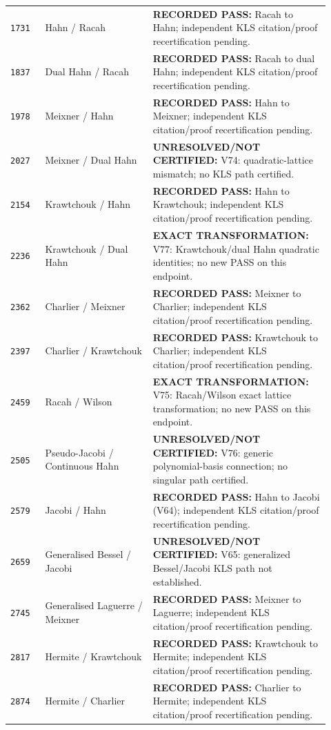 \documentclass[11pt]{article}
\begin{document}
\begin{longtable}{@{}p{0.10\linewidth}p{0.31\linewidth}p{0.51\linewidth}@{}}
\texttt{1731} & Hahn / Racah & \textbf{RECORDED PASS:} Racah to Hahn; independent KLS citation/proof recertification pending. \\
\texttt{1837} & Dual Hahn / Racah & \textbf{RECORDED PASS:} Racah to dual Hahn; independent KLS citation/proof recertification pending. \\
\texttt{1978} & Meixner / Hahn & \textbf{RECORDED PASS:} Hahn to Meixner; independent KLS citation/proof recertification pending. \\
\texttt{2027} & Meixner / Dual Hahn & \textbf{UNRESOLVED/NOT CERTIFIED:} V74: quadratic-lattice mismatch; no KLS path certified. \\
\texttt{2154} & Krawtchouk / Hahn & \textbf{RECORDED PASS:} Hahn to Krawtchouk; independent KLS citation/proof recertification pending. \\
\texttt{2236} & Krawtchouk / Dual Hahn & \textbf{EXACT TRANSFORMATION:} V77: Krawtchouk/dual Hahn quadratic identities; no new PASS on this endpoint. \\
\texttt{2362} & Charlier / Meixner & \textbf{RECORDED PASS:} Meixner to Charlier; independent KLS citation/proof recertification pending. \\
\texttt{2397} & Charlier / Krawtchouk & \textbf{RECORDED PASS:} Krawtchouk to Charlier; independent KLS citation/proof recertification pending. \\
\texttt{2459} & Racah / Wilson & \textbf{EXACT TRANSFORMATION:} V75: Racah/Wilson exact lattice transformation; no new PASS on this endpoint. \\
\texttt{2505} & Pseudo-Jacobi / Continuous Hahn & \textbf{UNRESOLVED/NOT CERTIFIED:} V76: generic polynomial-basis connection; no singular path certified. \\
\texttt{2579} & Jacobi / Hahn & \textbf{RECORDED PASS:} Hahn to Jacobi (V64); independent KLS citation/proof recertification pending. \\
\texttt{2659} & Generalised Bessel / Jacobi & \textbf{UNRESOLVED/NOT CERTIFIED:} V65: generalized Bessel/Jacobi KLS path not established. \\
\texttt{2745} & Generalised Laguerre / Meixner & \textbf{RECORDED PASS:} Meixner to Laguerre; independent KLS citation/proof recertification pending. \\
\texttt{2817} & Hermite / Krawtchouk & \textbf{RECORDED PASS:} Krawtchouk to Hermite; independent KLS citation/proof recertification pending. \\
\texttt{2874} & Hermite / Charlier & \textbf{RECORDED PASS:} Charlier to Hermite; independent KLS citation/proof recertification pending. \\
\end{longtable}
\endgroup
\end{document}
